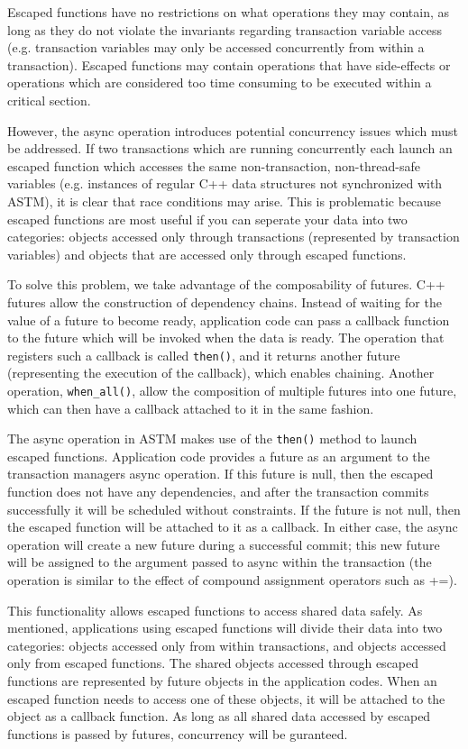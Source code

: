 \documentclass[conference]{IEEEtran}
\begin{document}
Escaped functions have no restrictions on what operations they may contain, as long as they do not violate the invariants regarding transaction variable access (e.g. transaction variables may only be accessed concurrently from within a transaction). Escaped functions may contain operations that have side-effects or operations which are considered too time consuming to be executed within a critical section.

However, the async operation introduces potential concurrency issues which must be addressed. If two transactions which are running concurrently each launch an escaped function which accesses the same non-transaction, non-thread-safe variables (e.g. instances of regular C++ data structures not synchronized with ASTM), it is clear that race conditions may arise. This is problematic because escaped functions are most useful if you can seperate your data into two categories: objects accessed only through transactions (represented by transaction variables) and objects that are accessed only through escaped functions.

To solve this problem, we take advantage of the composability of futures. C++ futures allow the construction of dependency chains. Instead of waiting for the value of a future to become ready, application code can pass a callback function to the future which will be invoked when the data is ready. The operation that registers such a callback is called \lstinline$then()$, and it returns another future (representing the execution of the callback), which enables chaining. Another operation, \lstinline$when_all()$, allow the composition of multiple futures into one future, which can then have a callback attached to it in the same fashion.

The async operation in ASTM makes use of the \lstinline$then()$ method to launch escaped functions. Application code provides a future as an argument to the transaction managers async operation. If this future is null, then the escaped function does not have any dependencies, and after the transaction commits successfully it will be scheduled without constraints. If the future is not null, then the escaped function will be attached to it as a callback. In either case, the async operation will create a new future during a successful commit; this new future will be assigned to the argument passed to async within the transaction (the operation is similar to the effect of compound assignment operators such as +=).

This functionality allows escaped functions to access shared data safely. As mentioned, applications using escaped functions will divide their data into two categories: objects accessed only from within transactions, and objects accessed only from escaped functions. The shared objects accessed through escaped functions are represented by future objects in the application codes. When an escaped function needs to access one of these objects, it will be attached to the object as a callback function. As long as all shared data accessed by escaped functions is passed by futures, concurrency will be guranteed.
\end{document}
